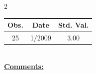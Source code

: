
\bigskip 
\begin{multicols}{2}{ 
\begin{tabular}{ccc}
\hline  Obs.  &  Date &  Std. Val. \\ 
\hline 
                       25 &        1/2009 &          3.00 \vspace{-.12in} \\  
 \end{tabular} 
\\ 
 \columnbreak 
 \singlespacing 
 \underline{\textbf{Comments:}} \\ 
 \bigskip       

 } 
\end{multicols} 

